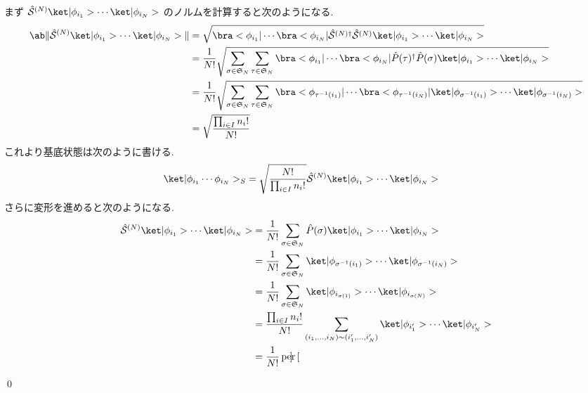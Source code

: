 \documentclass[uplatex,dvipdfmx,a4paper,11pt]{jlreq}
\makeatletter
\DeclareMathOperator{\per}{per}
\renewcommand{\SS}{\mathfrak{S}}
\renewcommand{\S}{\mathcal{S}}
\numberwithin{equation}{section}
\theoremstyle{definition}
\renewenvironment{proof}[1][\proofname]{\par
  \normalfont
  \topsep6\p@\@plus6\p@ \trivlist
  \item[\hskip\labelsep{\bfseries #1}\@addpunct{\bfseries}]\ignorespaces\quad\par
}{
  \qed\endtrivlist\@endpefalse
}
\renewcommand\proofname{証明}
\makeatother
\begin{document}
\begin{proof}
  まず $\hat{\S}^{(N)}\ket|\phi_{i_1}>\cdots\ket|\phi_{i_N}>$ のノルムを計算すると次のようになる.
  \begin{align}
    \ab\|\hat{\S}^{(N)}\ket|\phi_{i_1}>\cdots\ket|\phi_{i_N}>\| & = \sqrt{\bra<\phi_{i_1}|\cdots\bra<\phi_{i_N}|\hat{\S}^{(N)\dagger}\hat{\S}^{(N)}\ket|\phi_{i_1}>\cdots\ket|\phi_{i_N}>}                                                                  \\
                                                                & = \frac{1}{N!}\sqrt{\sum_{\sigma\in\SS_N}\sum_{\tau\in\SS_N}\bra<\phi_{i_1}|\cdots\bra<\phi_{i_N}|\hat{P}(\tau)^\dagger\hat{P}(\sigma)\ket|\phi_{i_1}>\cdots\ket|\phi_{i_N}>}             \\
                                                                & = \frac{1}{N!}\sqrt{\sum_{\sigma\in\SS_N}\sum_{\tau\in\SS_N}\bra<\phi_{\tau^{-1}(i_1)}|\cdots\bra<\phi_{\tau^{-1}(i_N)}|\ket|\phi_{\sigma^{-1}(i_1)}>\cdots\ket|\phi_{\sigma^{-1}(i_N)}>} \\
                                                                & = \sqrt{\frac{\prod_{i\in I}n_i!}{N!}}
  \end{align}
  これより基底状態は次のように書ける.
  \begin{align}
    \ket|\phi_{i_1}\cdots\phi_{i_N}>_S & = \sqrt{\frac{N!}{\prod_{i\in I}n_i!}}\hat{\S}^{(N)}\ket|\phi_{i_1}>\cdots\ket|\phi_{i_N}>
  \end{align}
  さらに変形を進めると次のようになる.
  \begin{align}
    \hat{\S}^{(N)}\ket|\phi_{i_1}>\cdots\ket|\phi_{i_N}> & = \frac{1}{N!}\sum_{\sigma\in\SS_N}\hat{P}(\sigma)\ket|\phi_{i_1}>\cdots\ket|\phi_{i_N}>                             \\
                                                         & = \frac{1}{N!}\sum_{\sigma\in\SS_N}\ket|\phi_{\sigma^{-1}(i_1)}>\cdots\ket|\phi_{\sigma^{-1}(i_N)}>                  \\
                                                         & = \frac{1}{N!}\sum_{\sigma\in\SS_N}\ket|\phi_{i_{\sigma(1)}}>\cdots\ket|\phi_{i_{\sigma(N)}}>                        \\
                                                         & = \frac{\prod_{i\in I}n_i!}{N!}\sum_{(i_1,\ldots,i_N)\sim(i_1',\ldots,i_N')}\ket|\phi_{i_1'}>\cdots\ket|\phi_{i_N'}> \\
                                                         & = \frac{1}{N!}\per\begin{bmatrix}

\end{bmatrix}
\end{align}
\end{proof}
\end{document}

